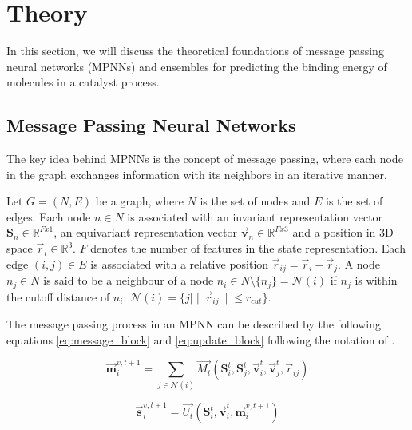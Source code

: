 \section{Theory}\label{sec:theory}

In this section, we will discuss the theoretical foundations of message passing neural networks (MPNNs) and ensembles for predicting
the binding energy of molecules in a catalyst process.

\subsection{Message Passing Neural Networks}\label{subsec:modelling_task}

The key idea behind MPNNs is the concept of
message passing, where each node in the graph exchanges information with its neighbors in an iterative manner.

Let $G = (N, E)$ be a graph, where $N$ is the set of nodes and $E$ is the set of edges.
Each node $n \in N$ is associated with an invariant representation vector $\mathbf{S}_{n} \in \mathbb{R}^{Fx1}$,
an equivariant representation
vector $\vec{\mathbf{v}}_{n} \in \mathbb{R}^{Fx3}$ and a position in 3D space $\vec{r}_{i} \in \mathbb{R}^3$.
$F$ denotes the number of features in the state representation.
Each edge $(i, j) \in E$ is associated with a relative position $\vec{r}_{ij} = \vec{r}_{i} - \vec{r}_{j}$.
A node $n_{j} \in N$ is said to be a neighbour of a node $n_{i} \in N \setminus \{n_{j}\} = \mathcal{N}(i) $
if $n_{j}$ is within the cutoff distance of $n_{i}$: $\mathcal{N}(i) = \{j |\lVert \vec{r}_{ij} \rVert \leq r_{cut}  \}$.


The message passing process in an MPNN can be described by the following equations \ref{eq:message_block} and \ref{eq:update_block}
following the notation of \cite{PAINN}.

\begin{equation}\label{eq:message_block}
    \vec{\mathbf{m}}_{i}^{v,t+1} = \sum_{j \in \mathcal{N}(i)} \vec{M_t}(\mathbf{S}_{i}^{t}, \mathbf{S}_{j}^{t}, \vec{\mathbf{v}}_{i}^{t}, \vec{\mathbf{v}}_{j}^{t}, \vec{r}_{ij})
\end{equation}

\begin{equation}\label{eq:update_block}
    \vec{\mathbf{s}}_{i}^{v,t+1} = \vec{U_t}(\mathbf{S}_{i}^{t}, \vec{\mathbf{v}}_{i}^{t}, \vec{\mathbf{m}}_{i}^{v,t+1})
\end{equation}

